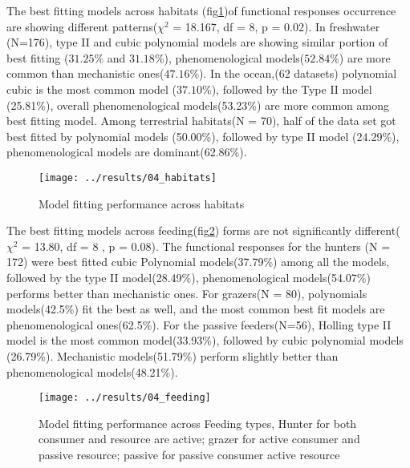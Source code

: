\documentclass[11pt, a4paper]{article}
\begin{document}
The best fitting models across habitats (fig\ref{fig:04habitats})of functional responses occurrence are showing different patterns($ \chi^{2} $ = 18.167, df = 8, p = 0.02). In freshwater (N=176), type II and cubic polynomial models are showing similar portion of best fitting ($ 31.25\% $ and $ 31.18\% $),
 phenomenological models($ 52.84\% $) are more common than mechanistic ones($ 47.16\% $). 
 In the ocean,(62 datasets) polynomial cubic is the most common model ($ 37.10\% $), followed by the Type II  model (25.81\%), overall  phenomenological models(53.23\%) are more common among best fitting model. Among terrestrial habitats(N = 70), half of the data set got best fitted by polynomial models (50.00\%), followed by type II model (24.29\%), phenomenological models are dominant(62.86\%).
 \begin{figure}
 	\centering
 	\texttt{[image: ../results/04\_habitats]}
 	\caption{Model fitting performance across habitats}
 	\label{fig:04habitats}
 \end{figure}
 \vspace{0.1\baselineskip}

The best fitting models across feeding(fig\ref{fig:04feeding}) forms are not significantly different($ \chi^{2} $ = 13.80, df = 8 , p = 0.08). The functional responses for the hunters (N = 172)  were best fitted cubic Polynomial models(37.79\%)  among all the models, followed by the type II model(28.49\%), phenomenological models(54.07\%) performs better than mechanistic ones. For grazers(N = 80), polynomials models(42.5\%) fit the best as well, and the most common best fit models are phenomenological ones(62.5\%). For the passive feeders(N=56), Holling type II model is the most common model(33.93\%), followed by cubic polynomial models (26.79\%). Mechanistic models(51.79\%) perform slightly better than  phenomenological models(48.21\%).
\begin{figure}
	\centering
	\texttt{[image: ../results/04\_feeding]}
	\caption{Model fitting performance across Feeding types, Hunter for both consumer and resource are active; grazer for active consumer and passive resource; passive for passive consumer active resource}
	\label{fig:04feeding}
\end{figure}


\vspace{0.1\baselineskip}
\end{document}
